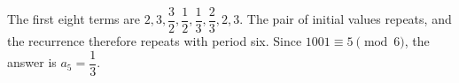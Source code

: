 The first eight terms are $2,3,\dfrac{3}{2},\dfrac{1}{2},\dfrac{1}{3},\dfrac{2}{3},2,3$. The pair of initial values repeats, and the recurrence therefore repeats with period six. Since $1001\equiv5\pmod6$, the answer is $a_5=\boxed{\dfrac{1}{3}}$.
